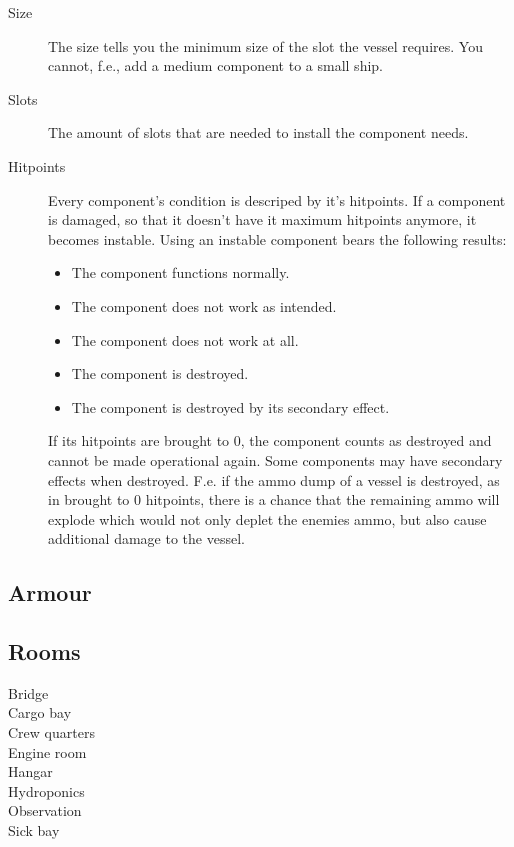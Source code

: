 \begin{description}
  \item[Size] The size tells you the minimum size of the slot the vessel requires. You cannot, f.e., add a medium component to a small ship.
  \item[Slots] The amount of slots that are needed to install the component needs.
  \item[Hitpoints] Every component's condition is descriped by it's hitpoints. If a component is damaged, so that it doesn't have it maximum hitpoints anymore, it becomes instable. Using an instable component bears the following results:
  \begin{itemize}
    \item The component functions normally.
    \item The component does not work as intended.
    \item The component does not work at all.
    \item The component is destroyed.
    \item The component is destroyed by its secondary effect.
  \end{itemize}
  If its hitpoints are brought to 0, the component counts as destroyed and cannot be made operational again. Some components may have secondary effects when destroyed. F.e. if the ammo dump of a vessel is destroyed, as in brought to 0 hitpoints, there is a chance that the remaining ammo will explode which would not only deplet the enemies ammo, but also cause additional damage to the vessel.
\end{description}

\subsection{Armour}
\label{sub:Vessel-Armour}

\subsection{Rooms}
\label{sub:Vessel-Rooms}

\begin{description}
  \item[Bridge]
  \item[Cargo bay]
  \item[Crew quarters]
  \item[Engine room]
  \item[Hangar]
  \item[Hydroponics]
  \item[Observation]
  \item[Sick bay]
\end{description}

